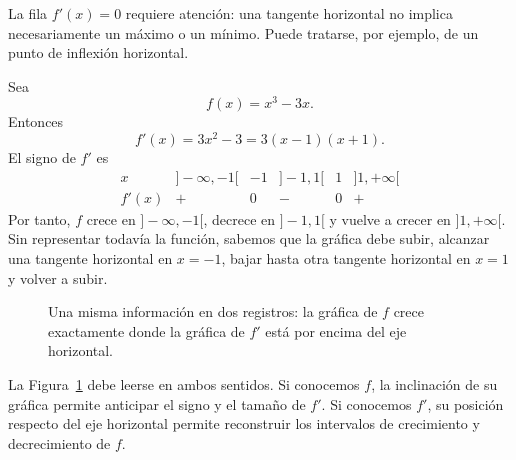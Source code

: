 La fila $f'(x)=0$ requiere atención: una tangente horizontal no implica necesariamente un máximo o un mínimo. Puede tratarse, por ejemplo, de un punto de inflexión horizontal.

\begin{example}
Sea
\[
f(x)=x^3-3x.
\]
Entonces
\[
f'(x)=3x^2-3=3(x-1)(x+1).
\]
El signo de $f'$ es
\[
\begin{array}{c|ccccc}
x & ]-\infty,-1[ & -1 & ]-1,1[ & 1 & ]1,+\infty[\\
\hline
f'(x) & + & 0 & - & 0 & +
\end{array}
\]
Por tanto, $f$ crece en $]-\infty,-1[$, decrece en $]-1,1[$ y vuelve a crecer en $]1,+\infty[$. Sin representar todavía la función, sabemos que la gráfica debe subir, alcanzar una tangente horizontal en $x=-1$, bajar hasta otra tangente horizontal en $x=1$ y volver a subir.
\end{example}

\begin{figure}[htbp]
\centering
\begin{minipage}{.48\textwidth}
\centering
{}
\end{minipage}\hfill
\begin{minipage}{.48\textwidth}
\centering
{}
\end{minipage}
\caption{Una misma información en dos registros: la gráfica de $f$ crece exactamente donde la gráfica de $f'$ está por encima del eje horizontal.}
\label{fig:f-y-derivada}
\end{figure}

La Figura~\ref{fig:f-y-derivada} debe leerse en ambos sentidos. Si conocemos $f$, la inclinación de su gráfica permite anticipar el signo y el tamaño de $f'$. Si conocemos $f'$, su posición respecto del eje horizontal permite reconstruir los intervalos de crecimiento y decrecimiento de $f$.

